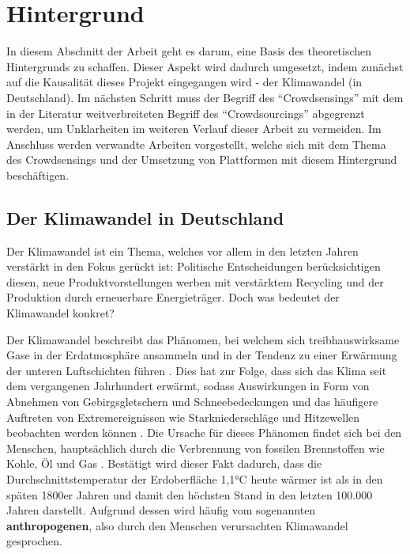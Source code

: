 \chapter{Hintergrund} %
In diesem Abschnitt der Arbeit geht es darum, eine Basis des theoretischen Hintergrunds zu schaffen. Dieser Aspekt wird dadurch umgesetzt, indem zunächst auf die Kausalität dieses Projekt eingegangen wird - der Klimawandel (in Deutschland). Im nächsten Schritt muss der Begriff des \enquote{Crowdsensings} mit dem in der Literatur weitverbreiteten Begriff des \enquote{Crowdsourcings} abgegrenzt werden, um Unklarheiten im weiteren Verlauf dieser Arbeit zu vermeiden. Im Anschluss werden verwandte Arbeiten vorgestellt, welche sich mit dem Thema des Crowdsensings und der Umsetzung von Plattformen mit diesem Hintergrund beschäftigen.

\section{Der Klimawandel in Deutschland}
Der Klimawandel ist ein Thema, welches vor allem in den letzten Jahren verstärkt in den Fokus gerückt ist: Politische Entscheidungen berücksichtigen diesen, neue Produktvorstellungen werben mit verstärktem Recycling und der Produktion durch erneuerbare Energieträger. Doch was bedeutet der Klimawandel konkret? 

Der Klimawandel beschreibt das Phänomen, bei welchem sich treibhauswirksame Gase in der Erdatmosphäre ansammeln und in der Tendenz zu einer Erwärmung der unteren Luftschichten führen \cite{UmweltbundesamtKlimawandel}. Dies hat zur Folge, dass sich das Klima seit dem vergangenen Jahrhundert erwärmt, sodass Auswirkungen in Form von Abnehmen von Gebirgsgletschern und Schneebedeckungen und das häufigere Auftreten von Extremereignissen wie Starkniederschläge und Hitzewellen beobachten werden können \cite{UmweltbundesamtKlimawandel}. Die Ursache für dieses Phänomen findet sich bei den Menschen, hauptsächlich durch die Verbrennung von fossilen Brennstoffen wie Kohle, Öl und Gas \cite{UnitedNationsClimateChange}. Bestätigt wird dieser Fakt dadurch, dass die Durchschnittstemperatur der Erdoberfläche 1,1°C heute wärmer ist als in den späten 1800er Jahren und damit den höchsten Stand in den letzten 100.000 Jahren \cite{UnitedNationsClimateChange} darstellt. Aufgrund dessen wird häufig vom sogenannten \textbf{anthropogenen}, also durch den Menschen verursachten Klimawandel gesprochen. %

